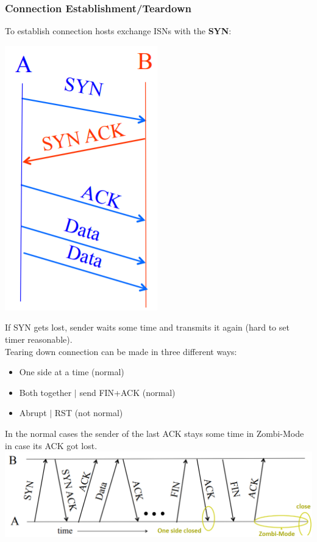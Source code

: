 \documentclass[a4paper, fontsize=8pt, landscape, DIV=1]{scrartcl}
\begin{document}
\begin{multicols*}{4}
		\subsubsection{Connection Establishment/Teardown}
		To establish connection hosts exchange ISNs with the \textbf{SYN}:\\
		\begin{center}
			\includegraphics[height=0.5\columnwidth]{images/Transport_Layer/SYN.png}
		\end{center}
		If SYN gets lost, sender waits some time and transmits it again (hard to set timer reasonable).\\
		Tearing down connection can be made in three different ways: 
		\begin{itemize}[noitemsep]
			\item One side at a time (normal)
			\item Both together $\vert$ send FIN+ACK (normal)
			\item Abrupt $\vert$ RST (not normal)
		\end{itemize} 
		In the normal cases the sender of the last ACK stays some time in Zombi-Mode in case its ACK got lost. 
		\includegraphics[width=\columnwidth]{images/Transport_Layer/TCP_FIN.png}
		\par 
		

\end{multicols*}
\end{document}
